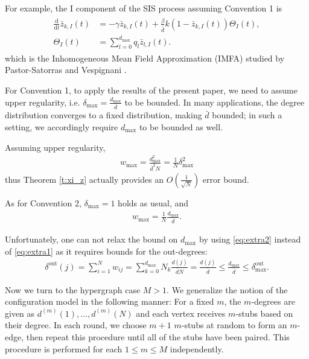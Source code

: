 \documentclass{article}
\renewcommand{\d}{\mathrm{d}}
\newcommand{\1}[1]{{\mathds{1}}_{\left\{#1\right\}}}
\newcommand{\rem}[1]{{#1}}
\begin{document}
	For example, the I component of the SIS process assuming Convention 1 is
	\begin{align}
		\label{eq:Vesp}
		\begin{split}
			\frac{\d}{\d t}\bar{z}_{k,I}(t)&= -\gamma \bar{z}_{k,I}(t)+\frac{\beta}{\bar{\bar{d}}} k \left(1-\bar{z}_{k,I}(t) \right)\Theta_I(t) \rem{,} \\ 
			\Theta_I(t)&=\sum_{l=0}^{d_{\textrm{max}}} q_{l}\bar{z}_{l,I}(t) \rem{.}
		\end{split}
	\end{align}
	which is the Inhomogeneous Mean Field Approximation (IMFA) studied by Pastor-Satorras and Vespignani \cite{vesp}.
	
	For Convention 1, to apply the results of the present paper, we need to assume upper regularity, i.e. $\delta_{\max}=\frac{d_{\max}}{\bar{d}}$ to be bounded. In many applications, the degree distribution converges to a fixed distribution, making $\bar{d}$ bounded; in such a setting, we accordingly require $d_{\max}$ to be bounded as well.
	
	Assuming upper regularity,
	\begin{align*}
		w_{\max}= \frac{d_{\max}^2}{\bar{d}^2 N}=\frac{1}{N}\delta_{\max}^2
	\end{align*}
	thus Theorem \ref{t:xi_z} actually provides an $O\left( \frac{1}{\sqrt{N}}\right)$ error bound.
	
	As for Convention 2, $\delta_{\max}=1$ holds as usual, and
	\begin{align*}
		w_{\max}=\frac{1}{N}\frac{d_{\max}}{\bar{d}}.
	\end{align*}
	
	Unfortunately, one can not relax the bound on $d_{\textrm{max}}$ by using \eqref{eq:extra2} instead of \eqref{eq:extra1} as it requires bounds for the out-degrees:
		\begin{align*}
		 \delta^{\textrm{out}}(j)=\sum_{i=1}^N w_{ij}= \sum_{k=0}^{d_{\textrm{max}}} N_k \frac{d(j)}{\bar{d}N}=\frac{d(j)}{\bar{d}} \leq \frac{d_{\textrm{max}}}{\bar{d}} \leq \delta_{\textrm{max}}^{\textrm{out}}.
		\end{align*}
	 
	
	
	Now we turn to the hypergraph case $M>1$. We generalize the notion of the configuration model in the following manner: For a fixed $m$, the $m$-degrees are given as $d^{(m)}(1), \dots, d^{(m)}(N)$ and each vertex receives $m$-stubs based on their degree. In each round, we choose $m+1$ $m$-stubs at random to form an $m$-edge, then repeat this procedure until all of the stubs have been paired. This procedure is performed for each $1 \leq m \leq M$ independently.
	
\end{document}

